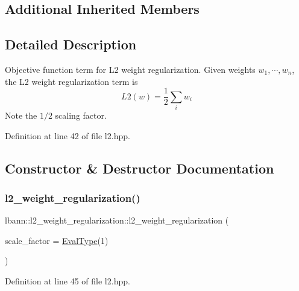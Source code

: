\subsection*{Additional Inherited Members}


\subsection{Detailed Description}
Objective function term for L2 weight regularization. Given weights $w_1,\cdots,w_n$, the L2 weight regularization term is \[ L2(w) = \frac{1}{2} \sum\limits_{i} w_i \] Note the $1/2$ scaling factor. 

Definition at line 42 of file l2.\+hpp.



\subsection{Constructor \& Destructor Documentation}
\mbox{\label{classlbann_1_1l2__weight__regularization_aa2a01507574b4d349ae8bb9bb784ecaf}} 
\subsubsection{\texorpdfstring{l2\+\_\+weight\+\_\+regularization()}{l2\_weight\_regularization()}}
{\footnotesize\ttfamily lbann\+::l2\+\_\+weight\+\_\+regularization\+::l2\+\_\+weight\+\_\+regularization (\begin{DoxyParamCaption}\item[{\hyperlink{base_8hpp_a3266f5ac18504bbadea983c109566867}{Eval\+Type}}]{scale\+\_\+factor = {\ttfamily \hyperlink{base_8hpp_a3266f5ac18504bbadea983c109566867}{Eval\+Type}(1)} }\end{DoxyParamCaption})\hspace{0.3cm}{\ttfamily [inline]}}



Definition at line 45 of file l2.\+hpp.


